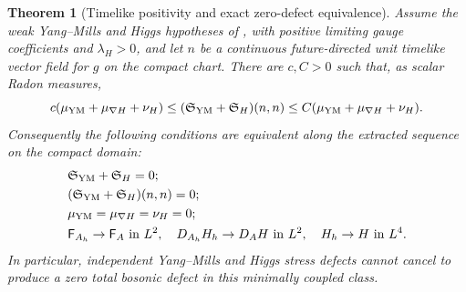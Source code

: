\documentclass[11pt]{article}
\numberwithin{equation}{section}
\newtheorem{theorem}{Theorem}[section]
\theoremstyle{definition}
\theoremstyle{remark}
\newcommand{\Fcurv}{\mathsf F}
\begin{document}
\begin{theorem}[Timelike positivity and exact zero-defect equivalence]
\label{thm:zero-defect-characterization}
Assume the weak Yang--Mills and Higgs hypotheses of
, with positive limiting gauge coefficients and
$\lambda_H>0$, and let $n$ be a continuous future-directed unit timelike
vector field for $g$ on the compact chart.  There are $c,C>0$ such that,
as scalar Radon measures,
\begin{equation}
 c(\mu_{\rm YM}+\mu_{\nabla H}+\nu_H)
 \le (\mathfrak S_{\rm YM}+\mathfrak S_H)(n,n)
 \le C(\mu_{\rm YM}+\mu_{\nabla H}+\nu_H).
 \label{eq:timelike-defect-coercivity}
\end{equation}
Consequently the following conditions are equivalent along the extracted
sequence on the compact domain:
\begin{align}
 &\mathfrak S_{\rm YM}+\mathfrak S_H=0;\notag\\
 &(\mathfrak S_{\rm YM}+\mathfrak S_H)(n,n)=0;\notag\\
 &\mu_{\rm YM}=\mu_{\nabla H}=\nu_H=0;\notag\\
 &\Fcurv_{A_h}\to\Fcurv_A\text{ in }L^2,\quad
 D_{A_h}H_h\to D_AH\text{ in }L^2,\quad
 H_h\to H\text{ in }L^4.
 \label{eq:complete-zero-defect-equivalence}
\end{align}
In particular, independent Yang--Mills and Higgs stress defects cannot cancel
to produce a zero total bosonic defect in this minimally coupled class.
\end{theorem}
\end{document}
